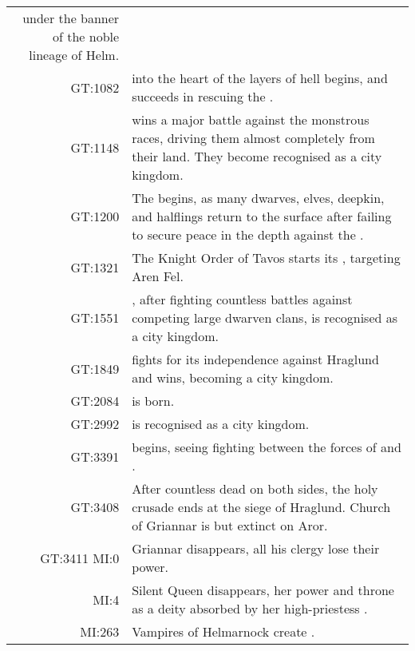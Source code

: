 \begin{longtable}{@{\,}r <{\hskip 6pt} !{
  \color{LightSteelBlue3}
  \makebox[0pt]{\textbullet}
  \hskip -2.6pt
  \vrule width 1pt
  \hspace{\labelsep}
  }
  >{\raggedright\arraybackslash}p{11cm}
}
                       under the banner of the noble lineage of Helm. \\
    GT:1082          &  into the heart of the
                       layers of hell begins, and succeeds in rescuing the
                       . \\
    GT:1148          &  wins a major battle against the
                       monstrous races, driving them almost completely from
                       their land. They become recognised as a city kingdom. \\
    GT:1200          & The  begins, as many dwarves,
                       elves, deepkin, and halflings return to the surface
                       after failing to secure peace in the depth against
                       the . \\
    GT:1321          & The Knight Order of Tavos starts its , targeting Aren Fel. \\
    GT:1551          & , after fighting countless battles
                       against competing large dwarven clans, is recognised as a
                       city kingdom. \\
    GT:1849          &  fights for its independence against
                       Hraglund and wins, becoming a city kingdom. \\
    GT:2084          &  is born. \\
    GT:2992          &  is recognised as a city kingdom. \\
    GT:3391          &  begins, seeing fighting
                       between the forces of  and
                       . \\
    GT:3408          & After countless dead on both sides, the holy crusade ends
                       at the siege of Hraglund. Church of Griannar is but
                       extinct on Aror. \\
    GT:3411 MI:0     & Griannar disappears, all his clergy lose their power. \\
    MI:4             & Silent Queen disappears, her power and throne as a deity
                       absorbed by her high-priestess . \\
    MI:263           & Vampires of Helmarnock create . \\

\end{longtable}
